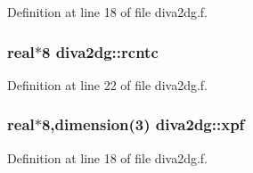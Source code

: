 Definition at line 18 of file diva2dg.f.\hypertarget{namespacediva2dg_8de740eca25720b2d20619260c87f18a}{
\subsubsection[rcntc]{\setlength{\rightskip}{0pt plus 5cm}real$\ast$8 {\bf diva2dg::rcntc}}}
\label{namespacediva2dg_8de740eca25720b2d20619260c87f18a}




Definition at line 22 of file diva2dg.f.\hypertarget{namespacediva2dg_7c5baa5f6aeaf641f17822bf2c727e65}{
\subsubsection[xpf]{\setlength{\rightskip}{0pt plus 5cm}real$\ast$8,dimension(3) {\bf diva2dg::xpf}}}
\label{namespacediva2dg_7c5baa5f6aeaf641f17822bf2c727e65}




Definition at line 18 of file diva2dg.f.